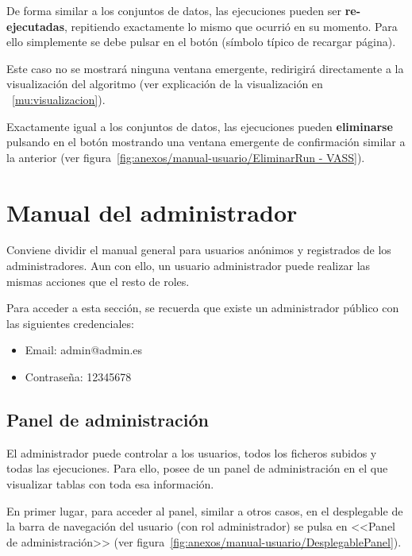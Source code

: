 
De forma similar a los conjuntos de datos, las ejecuciones pueden ser
\textbf{re-ejecutadas}, repitiendo exactamente lo mismo que ocurrió en su
momento. Para ello simplemente se debe pulsar en el botón
\button[vassgold]{\faRotateRight} (símbolo típico de recargar página).

Este caso no se mostrará ninguna ventana emergente, redirigirá directamente a la
visualización del algoritmo (ver explicación de la visualización en
~\ref{mu:visualizacion}).

\label{mu:eliminarrun}
Exactamente igual a los conjuntos de datos, las ejecuciones pueden
\textbf{eliminarse} pulsando en el botón \button[vassred]{\faTrash} mostrando
una ventana emergente de confirmación similar a la anterior (ver
figura~\ref{fig:anexos/manual-usuario/EliminarRun - VASS}).



\section{Manual del administrador}

Conviene dividir el manual general para usuarios anónimos y registrados de los
administradores. Aun con ello, un usuario administrador puede realizar las
mismas acciones que el resto de roles.

Para acceder a esta sección, se recuerda que existe un administrador público con
las siguientes credenciales:
\begin{itemize}
    \item Email: admin@admin.es
    \item Contraseña: 12345678
\end{itemize}

\subsection{Panel de administración}

El administrador puede controlar a los usuarios, todos los ficheros subidos y
todas las ejecuciones. Para ello, posee de un panel de administración en el que
visualizar tablas con toda esa información.

En primer lugar, para acceder al panel, similar a otros casos, en el desplegable
de la barra de navegación del usuario (con rol administrador) se pulsa en
<<Panel de administración>> (ver
figura~\ref{fig:anexos/manual-usuario/DesplegablePanel}).

